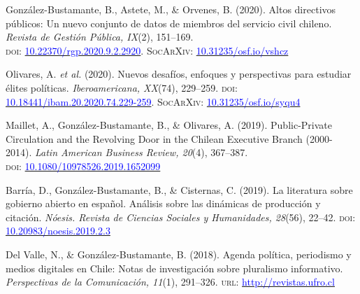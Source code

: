 \begin{publications}

\begin{benumerate}{8}

\item{\small González-Bustamante, B., Astete, M., \& Orvenes, B. (2020). Altos directivos públicos: Un nuevo conjunto de datos de miembros del servicio civil chileno. {\itshape Revista de Gestión Pública, IX}(2), 151--169. \\ {\scshape doi}: \href{https://doi.org/10.22370/rgp.2020.9.2.2920}{\textcolor{blue}{10.22370/rgp.2020.9.2.2920}}. {\scshape \footnotesize SocArXiv}: \href{https://doi.org/10.31235/osf.io/vshcz}{\textcolor{blue}{10.31235/osf.io/vshcz}}}\vspace{1mm}

\item{\small Olivares, A. {\itshape et al.} (2020). Nuevos desafíos, enfoques y perspectivas para estudiar élites políticas. {\itshape Iberoamericana, XX}(74), 229--259. {\scshape doi}: \href{https://doi.org/10.18441/ibam.20.2020.74.229-259}{\textcolor{blue}{10.18441/ibam.20.2020.74.229-259}}. {\scshape \footnotesize SocArXiv}: \href{https://doi.org/10.31235/osf.io/syqu4}{\textcolor{blue}{10.31235/osf.io/syqu4}}}\vspace{1mm}

\item{\small Maillet, A., Gonz\'alez-Bustamante, B., \& Olivares, A. (2019). Public-Private Circulation and the Revolving Door in the Chilean Executive Branch (2000-2014). {\itshape Latin American Business Review, 20}(4), 367--387. \\ {\scshape doi}: \href{https://doi.org/10.1080/10978526.2019.1652099}{\textcolor{blue}{10.1080/10978526.2019.1652099}}}\vspace{1mm}

\item{\small Barr\'ia, D., Gonz\'alez-Bustamante, B., \& Cisternas, C. (2019). La literatura sobre gobierno abierto en español. Análisis sobre las dinámicas de producción y citación. {\itshape N\'oesis. Revista de Ciencias Sociales y Humanidades, 28}(56), 22--42. {\scshape doi}: \href{http://dx.doi.org/10.20983/noesis.2019.2.3}{\textcolor{blue}{10.20983/noesis.2019.2.3}}}\vspace{1mm}

\item{\small Del Valle, N., \& Gonz\'alez-Bustamante, B. (2018). Agenda política, periodismo y medios digitales en Chile: Notas de investigación sobre pluralismo informativo. {\itshape Perspectivas de la Comunicaci\'on, 11}(1), 291--326. {\scshape url}: \href{http://revistas.ufro.cl/ojs/index.php/perspectivas/article/view/1146}{\textcolor{blue}{http://revistas.ufro.cl}}}\vspace{1mm}


\end{benumerate}
\end{publications}
